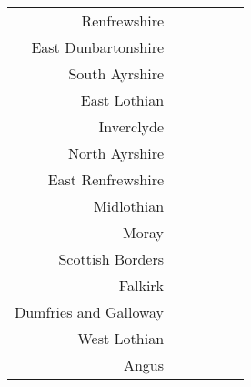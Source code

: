 \documentclass[
  12pt,
]{article}
\begin{document}
\begin{longtable}[t]{rrrrrr}
Renfrewshire & \cellcolor{white}{  50.8\%} & \cellcolor{white}{  34.5\%} & \cellcolor{white}{  27.5\%} & \cellcolor{white}{  41.5\%} & \cellcolor{white}{  53.3\%}\\
East Dunbartonshire & \cellcolor{white}{ 711.1\%} & \cellcolor{white}{1035.8\%} & \cellcolor{white}{ 185.3\%} & \cellcolor{white}{ 158.8\%} & \cellcolor{white}{  86.7\%}\\
South Ayrshire & \cellcolor{white}{  68.3\%} & \cellcolor{white}{} & \cellcolor{white}{  59.5\%} & \cellcolor{white}{  65.3\%} & \cellcolor{white}{  50.0\%}\\
East Lothian & \cellcolor{white}{} & \cellcolor{white}{} & \cellcolor{white}{ 202.4\%} & \cellcolor{white}{ 101.1\%} & \cellcolor{white}{ 100.2\%}\\
Inverclyde & \cellcolor{white}{ 159.2\%} & \cellcolor{white}{  90.5\%} & \cellcolor{white}{  89.9\%} & \cellcolor{white}{ 100.3\%} & \cellcolor{white}{  91.3\%}\\
North Ayrshire & \cellcolor{white}{ 445.1\%} & \cellcolor{white}{ 169.1\%} & \cellcolor{white}{ 172.3\%} & \cellcolor{white}{ 236.2\%} & \cellcolor{white}{ 204.6\%}\\
East Renfrewshire & \cellcolor{white}{ 136.5\%} & \cellcolor{white}{ 179.1\%} & \cellcolor{white}{ 159.7\%} & \cellcolor{white}{ 174.1\%} & \cellcolor{white}{ 181.6\%}\\
Midlothian & \cellcolor{white}{} & \cellcolor{white}{} & \cellcolor{white}{} & \cellcolor{white}{} & \cellcolor{white}{ 184.5\%}\\
Moray & \cellcolor{white}{  64.6\%} & \cellcolor{white}{  62.4\%} & \cellcolor{white}{  52.5\%} & \cellcolor{white}{  64.2\%} & \cellcolor{white}{  40.1\%}\\
Scottish Borders & \cellcolor{white}{ 286.6\%} & \cellcolor{white}{ 247.5\%} & \cellcolor{white}{ 224.1\%} & \cellcolor{white}{ 234.5\%} & \cellcolor{white}{ 179.0\%}\\
Falkirk & \cellcolor{white}{  87.1\%} & \cellcolor{white}{ 100.0\%} & \cellcolor{white}{  69.3\%} & \cellcolor{white}{  66.9\%} & \cellcolor{white}{  61.2\%}\\
Dumfries and Galloway & \cellcolor{white}{1542.9\%} & \cellcolor{white}{1771.4\%} & \cellcolor{white}{1400.0\%} & \cellcolor{white}{1252.9\%} & \cellcolor{white}{1818.2\%}\\
West Lothian & \cellcolor{white}{} & \cellcolor{white}{} & \cellcolor{white}{} & \cellcolor{white}{} & \cellcolor{white}{}\\
Angus & \cellcolor{white}{2216.7\%} & \cellcolor{white}{1900.0\%} & \cellcolor{white}{3166.7\%} & \cellcolor{white}{} & \cellcolor{white}{  39.6\%}\\

\end{longtable}
\end{document}
